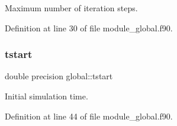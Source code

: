 Maximum number of iteration steps. 



Definition at line 30 of file module\+\_\+global.\+f90.

\mbox{\label{namespaceglobal_a07363365436fd22a91cdb5a847b4bb88}} 
\subsubsection{\texorpdfstring{tstart}{tstart}}
{\footnotesize\ttfamily double precision global\+::tstart}



Initial simulation time. 



Definition at line 44 of file module\+\_\+global.\+f90.


